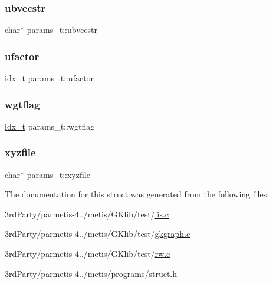 \mbox{\label{structparams__t_ab7449a52fac76208d0815fc0d79d02d6}} 
\subsubsection{\texorpdfstring{ubvecstr}{ubvecstr}}
{\footnotesize\ttfamily char$\ast$ params\+\_\+t\+::ubvecstr}

\mbox{\label{structparams__t_ad3f9b3dac3617977c041d2d22e9952d1}} 
\subsubsection{\texorpdfstring{ufactor}{ufactor}}
{\footnotesize\ttfamily \hyperlink{3rd_party_2parmetis-4_80_83_2metis_2include_2metis_8h_aaa5262be3e700770163401acb0150f52}{idx\+\_\+t} params\+\_\+t\+::ufactor}

\mbox{\label{structparams__t_a31078d895c8f54dd2857e4faf1ba04f0}} 
\subsubsection{\texorpdfstring{wgtflag}{wgtflag}}
{\footnotesize\ttfamily \hyperlink{3rd_party_2parmetis-4_80_83_2metis_2include_2metis_8h_aaa5262be3e700770163401acb0150f52}{idx\+\_\+t} params\+\_\+t\+::wgtflag}

\mbox{\label{structparams__t_a7ee1145ed927b19de209aaa4562a5d9e}} 
\subsubsection{\texorpdfstring{xyzfile}{xyzfile}}
{\footnotesize\ttfamily char$\ast$ params\+\_\+t\+::xyzfile}



The documentation for this struct was generated from the following files\+:\begin{DoxyCompactItemize}
\item 
3rd\+Party/parmetis-\/4../metis/\+G\+Klib/test/\hyperlink{fis_8c}{fis.\+c}\item 
3rd\+Party/parmetis-\/4../metis/\+G\+Klib/test/\hyperlink{gkgraph_8c}{gkgraph.\+c}\item 
3rd\+Party/parmetis-\/4../metis/\+G\+Klib/test/\hyperlink{test_2rw_8c}{rw.\+c}\item 
3rd\+Party/parmetis-\/4../metis/programs/\hyperlink{metis_2programs_2struct_8h}{struct.\+h}\end{DoxyCompactItemize}
